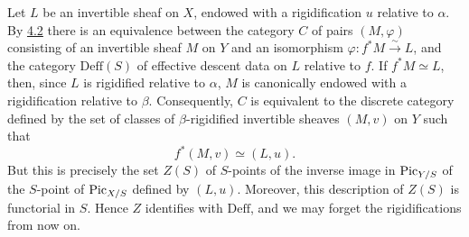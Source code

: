Let $L$ be an invertible sheaf on $X$, endowed with a rigidification $u$
relative to $\alpha$. By \hyperlink{sga6.e12.lem.4-2}{4.2} there is an equivalence between the category
$C$ of pairs $(M,\varphi)$ consisting of an invertible sheaf $M$ on $Y$ and
an isomorphism $\varphi:f^*M\xrightarrow{\sim}L$, and the category
$\mathrm{Deff}(S)$ of effective descent data on $L$ relative to $f$.
If $f^*M\simeq L$, then, since $L$ is rigidified relative to $\alpha$, $M$
is canonically endowed with a rigidification relative to $\beta$.
Consequently, $C$ is equivalent to the discrete category defined by the set
of classes of $\beta$-rigidified invertible sheaves $(M,v)$ on $Y$ such that
\[
  f^*(M,v)\simeq(L,u).
\]
But this is precisely the set $Z(S)$ of $S$-points of the inverse image in
$\operatorname{Pic}_{Y/S}$ of the $S$-point of $\operatorname{Pic}_{X/S}$ defined by $(L,u)$. Moreover,
this description of $Z(S)$ is functorial in $S$. Hence $Z$ identifies with
$\mathrm{Deff}$, and we may forget the rigidifications from now on.

